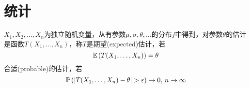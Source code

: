 
\section{统计}
\begin{definition}[估计]
$X_1,X_2,\ldots,X_n$为独立随机变量，从有参数$\mu,\sigma,\theta,\ldots$的分布$f$中得到，对参数$\theta$的估计是函数$T(X_1,\ldots,X_n)$，称$T$是期望(expected)估计，若
\[\mathbb{E}\left(T(X_1,\ldots,X_n)\right)=\theta\]
合适(probable)的估计，若
\[\pr{|T(X_1,\ldots,X_n)-\theta|>\eps}\to 0,\,n\to\infty\]
\end{definition}
